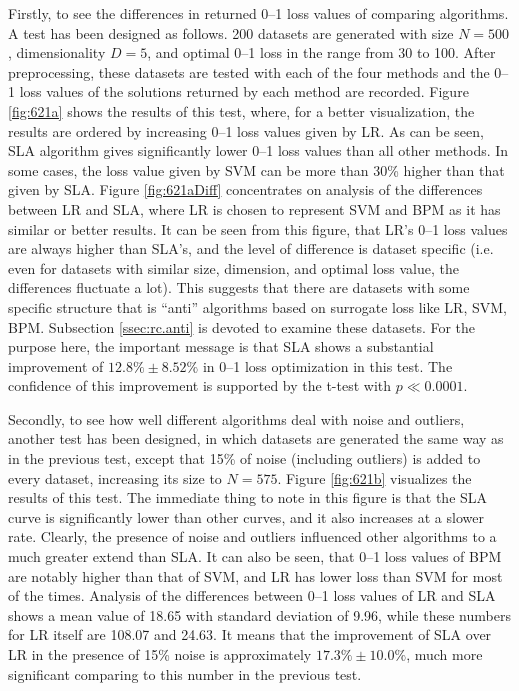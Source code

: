 Firstly, to see the differences in returned 0--1 loss values of
comparing algorithms. A test has been designed as follows. 200
datasets are generated with size $N=500$, dimensionality $D=5$, and
optimal 0--1 loss in the range from 30 to 100. After preprocessing,
these datasets are tested with each of the four methods and the 0--1
loss values of the solutions returned by each method are
recorded. Figure \ref{fig:621a} shows the results of this test, where,
for a better visualization, the results are ordered by increasing 0--1
loss values given by LR. As can be seen, SLA algorithm gives
significantly lower 0--1 loss values than all other methods. In some
cases, the loss value given by SVM can be more than 30\% higher than
that given by SLA. Figure \ref{fig:621aDiff} concentrates on analysis
of the differences between LR and SLA, where LR is chosen to represent
SVM and BPM as it has similar or better results. It can be seen from
this figure, that LR's 0--1 loss values are always higher than SLA's,
and the level of difference is dataset specific (i.e. even for
datasets with similar size, dimension, and optimal loss value, the
differences fluctuate a lot). This suggests that there are datasets
with some specific structure that is ``anti'' algorithms based on
surrogate loss like LR, SVM, BPM. Subsection \ref{ssec:rc.anti} is
devoted to examine these datasets. For the purpose here, the important
message is that SLA shows a substantial improvement of $12.8\% \pm
8.52\%$ in 0--1 loss optimization in this test. The confidence of this
improvement is supported by the t-test with $p \ll 0.0001$.

Secondly, to see how well different algorithms deal with noise and
outliers, another test has been designed, in which datasets are
generated the same way as in the previous test, except that 15\% of
noise (including outliers) is added to every dataset, increasing its
size to $N=575$. Figure \ref{fig:621b} visualizes the results of this
test. The immediate thing to note in this figure is that the SLA curve
is significantly lower than other curves, and it also increases at a
slower rate. Clearly, the presence of noise and outliers influenced
other algorithms to a much greater extend than SLA. It can also be
seen, that 0--1 loss values of BPM are notably higher than that of
SVM, and LR has lower loss than SVM for most of the times. Analysis of
the differences between 0--1 loss values of LR and SLA shows a mean
value of 18.65 with standard deviation of 9.96, while these numbers
for LR itself are 108.07 and 24.63. It means that the improvement of
SLA over LR in the presence of 15\% noise is approximately $17.3\% \pm
10.0\%$, much more significant comparing to this number in the
previous test.


